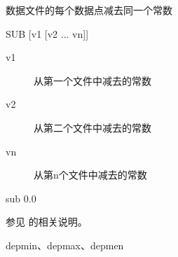\label{cmd:sub}

数据文件的每个数据点减去同一个常数

\begin{SACSTX}
SUB  [v1 [v2 ... vn]]
\end{SACSTX}

\begin{description}
\item [v1] 从第一个文件中减去的常数
\item [v2] 从第二个文件中减去的常数
\item [vn] 从第n个文件中减去的常数
\end{description}

\begin{SACDFT}
sub 0.0
\end{SACDFT}

参见  的相关说明。

depmin、depmax、depmen
